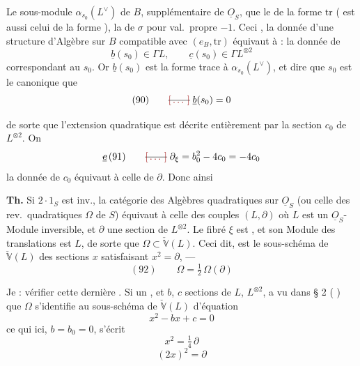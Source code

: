 \documentclass[11pt,a4paper]{article}
\begin{document}
Le sous-module $\alpha_{s_0}(L^{\vee})$ de $B$, supplémentaire de $\underline{O}_S$,
 que le  de la forme $\mathrm{tr}$
( est aussi celui de la forme \ill{}),
 la \ill{}  de $\sigma$ pour
val.\ propre $-1$. Ceci , la donnée d'une structure d'Algèbre sur
$B$ compatible avec $(e_B, \mathrm{tr})$ équivaut à : la donnée de
\[
\underline{b}(s_0) \in \Gamma L, \qquad \underline{c}(s_0) \in \Gamma L^{\otimes 2}
\]
correspondant au  $s_0$. Or  $\underline{b}(s_0)$ \ill{}  est la forme trace
 à $\alpha_{s_0}(L^{\vee})$, et dire que $s_0$ est le
 canonique  que
\[
(90)\qquad \text{\struck{\ill{}}}\; \underline{b}(s_0) = 0
\]


de sorte que l'extension quadratique est décrite entièrement par la section $c_0$
de $L^{\otimes 2}$. On 
\[
\text{\struck{$\underline{c}$}}\,(91)\qquad \text{\struck{\ill{}}}\;
\partial_{\xi} = b_0^2 - 4 c_0 = -4 c_0
\]
 la donnée de $c_0$ équivaut à celle de $\partial$. Donc
ainsi

\textbf{Th.} Si $2 \cdot 1_S$ est inv., la catégorie des Algèbres quadratiques
sur $\underline{O}_S$  (ou celle des rev.\ quadratiques
$\Omega$ \struck{\ill{}} de $S$) équivaut à celle des couples $(L, \partial)$
où $L$ est un $\underline{O}_S$-Module inversible, et $\partial$
\struck{\ill{}} une section de $L^{\otimes 2}$. Le fibré 
 \struck{\ill{}} $\xi$ est
 , et son Module des translations est
$L$, de sorte que $\Omega \subset \check{\mathbb{V}}(L)$\struck{$\xi$}. Ceci dit,
\add{$\Omega(\partial)$}  est le sous-schéma de
$\check{\mathbb{V}}(L)$ des sections $x$ satisfaisant $x^2 = \partial$,
 --- 
\[
(92)\qquad \Omega = \tfrac{1}{2}\, \Omega(\partial)
\]

Je  : vérifier cette dernière .
Si  un  , et $b$, $c$
 sections  de $L$, $L^{\otimes 2}$,
\uncertain{\ill{}}  a vu dans § 2 ( )
que $\Omega$ s'identifie au sous-schéma de $\check{\mathbb{V}}(L)$ d'équation
\[
x^2 - b x + c = 0
\]
ce qui ici, \struck{\ill{}}  $b = b_0 = 0$, s'écrit
\[
x^2 = \tfrac{1}{4}\, \partial
\]
\[
(2x)^2 = \partial
\]
\end{document}
